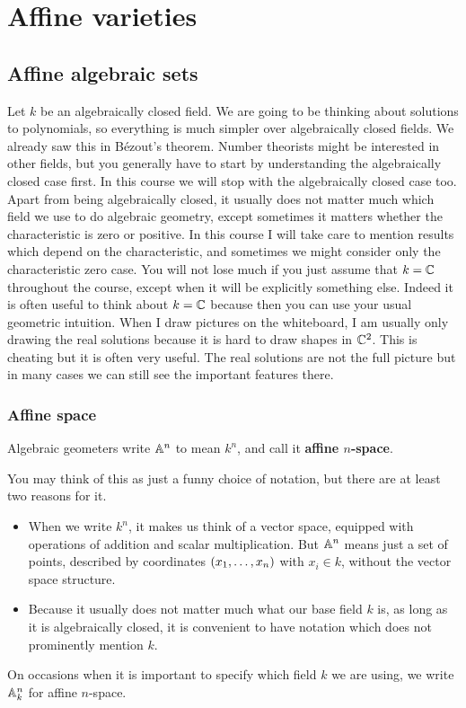 \pagebreak

\section{Affine varieties}

\subsection{Affine algebraic sets}

Let $ k $ be an algebraically closed field. We are going to be thinking about solutions to polynomials, so everything is much simpler over algebraically closed fields. We already saw this in B\'ezout's theorem. Number theorists might be interested in other fields, but you generally have to start by understanding the algebraically closed case first. In this course we will stop with the algebraically closed case too. Apart from being algebraically closed, it usually does not matter much which field we use to do algebraic geometry, except sometimes it matters whether the characteristic is zero or positive. In this course I will take care to mention results which depend on the characteristic, and sometimes we might consider only the characteristic zero case. You will not lose much if you just assume that $ k = \CC $ throughout the course, except when it will be explicitly something else. Indeed it is often useful to think about $ k = \CC $ because then you can use your usual geometric intuition. When I draw pictures on the whiteboard, I am usually only drawing the real solutions because it is hard to draw shapes in $ \CC^2 $. This is cheating but it is often very useful. The real solutions are not the full picture but in many cases we can still see the important features there.

\subsubsection{Affine space}

\begin{definition*}
Algebraic geometers write $ \AA^n $ to mean $ k^n $, and call it \textbf{affine $ n $-space}.
\end{definition*}

You may think of this as just a funny choice of notation, but there are at least two reasons for it.
\begin{itemize}
\item When we write $ k^n $, it makes us think of a vector space, equipped with operations of addition and scalar multiplication. But $ \AA^n $ means just a set of points, described by coordinates $ \br{x_1, \dots, x_n} $ with $ x_i \in k $, without the vector space structure.
\item Because it usually does not matter much what our base field $ k $ is, as long as it is algebraically closed, it is convenient to have notation which does not prominently mention $ k $.
\end{itemize}
On occasions when it is important to specify which field $ k $ we are using, we write $ \AA_k^n $ for affine $ n $-space.

